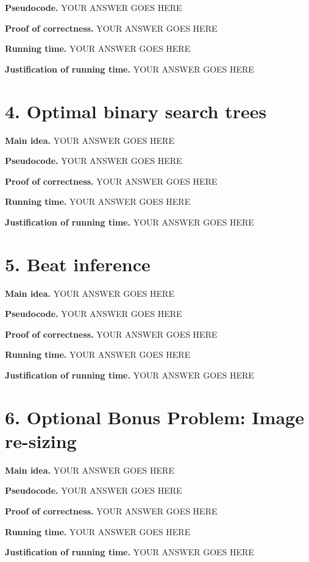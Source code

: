 \documentclass[11pt]{article}
\begin{document}
\noindent
\textbf{Pseudocode.}
YOUR ANSWER GOES HERE

\noindent
\textbf{Proof of correctness.}
YOUR ANSWER GOES HERE


\noindent
\textbf{Running time.}
YOUR ANSWER GOES HERE


\noindent
\textbf{Justification of running time.}
YOUR ANSWER GOES HERE


\newpage
\section*{4. Optimal binary search trees}
\noindent
\textbf{Main idea.}
YOUR ANSWER GOES HERE


\noindent
\textbf{Pseudocode.}
YOUR ANSWER GOES HERE

\noindent
\textbf{Proof of correctness.}
YOUR ANSWER GOES HERE


\noindent
\textbf{Running time.}
YOUR ANSWER GOES HERE


\noindent
\textbf{Justification of running time.}
YOUR ANSWER GOES HERE


\newpage
\section*{5. Beat inference}
\noindent
\textbf{Main idea.}
YOUR ANSWER GOES HERE


\noindent
\textbf{Pseudocode.}
YOUR ANSWER GOES HERE

\noindent
\textbf{Proof of correctness.}
YOUR ANSWER GOES HERE


\noindent
\textbf{Running time.}
YOUR ANSWER GOES HERE


\noindent
\textbf{Justification of running time.}
YOUR ANSWER GOES HERE


\newpage
\section*{6. Optional Bonus Problem: Image re-sizing}
\noindent
\textbf{Main idea.}
YOUR ANSWER GOES HERE


\noindent
\textbf{Pseudocode.}
YOUR ANSWER GOES HERE

\noindent
\textbf{Proof of correctness.}
YOUR ANSWER GOES HERE


\noindent
\textbf{Running time.}
YOUR ANSWER GOES HERE


\noindent
\textbf{Justification of running time.}
YOUR ANSWER GOES HERE
\end{document}
